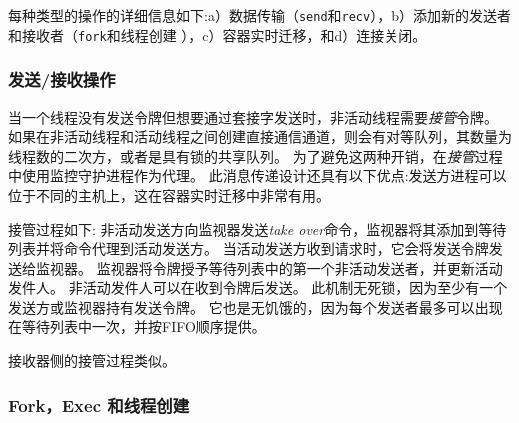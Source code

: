 
每种类型的操作的详细信息如下:a）数据传输（\texttt {send}和\texttt {recv}），b）添加新的发送者和接收者（\texttt {fork}和线程创建 ），c）容器实时迁移，和d）连接关闭。

\subsubsection{发送/接收操作}
\label{socksdirect:subsubsec:fork_rdwr}


当一个线程没有发送令牌但想要通过套接字发送时，非活动线程需要\emph {接管}令牌。
如果在非活动线程和活动线程之间创建直接通信通道，则会有对等队列，其数量为线程数的二次方，或者是具有锁的共享队列。
为了避免这两种开销，在\emph {接管}过程中使用监控守护进程作为代理。
此消息传递设计还具有以下优点:发送方进程可以位于不同的主机上，这在容器实时迁移中非常有用。

接管过程如下:
非活动发送方向监视器发送\emph {take over}命令，监视器将其添加到等待列表并将命令代理到活动发送方。
当活动发送方收到请求时，它会将发送令牌发送给监视器。
监视器将令牌授予等待列表中的第一个非活动发送者，并更新活动发件人。
非活动发件人可以在收到令牌后发送。
此机制无死锁，因为至少有一个发送方或监视器持有发送令牌。
它也是无饥饿的，因为每个发送者最多可以出现在等待列表中一次，并按FIFO顺序提供。

接收器侧的接管过程类似。



\subsubsection{Fork，Exec 和线程创建}
\label{socksdirect:subsubsec:fork_fork}


